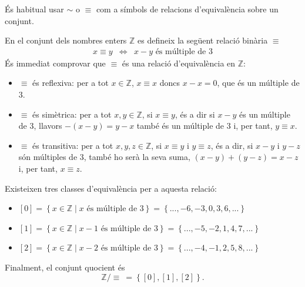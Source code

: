 És habitual usar $\sim$ o $\equiv$ com a símbols de relacions
d'equivalència sobre un conjunt.

\begin{exemple}
En el conjunt dels nombres enters $\mathbb{Z}$ es defineix la següent
relació binària $\equiv$%
\begin{equation*}
\begin{array}{ccc}
x\equiv y & \Longleftrightarrow & x-y\text{ és múltiple de }3%
\end{array}
\end{equation*}
És immediat comprovar que $\equiv$ és una relació d'equivalència en $\mathbb{Z}$:

\begin{itemize}
\item $\equiv$ és reflexiva: per a tot $x\in\mathbb{Z}$, $x\equiv x$
doncs $x-x=0$, que és un múltiple de $3$.

\item $\equiv$ és simètrica: per a tot $x,y\in\mathbb{Z}$, si $%
x\equiv y$, és a dir si $x-y$ és un múltiple de $3$, llavors 
$-(x-y)=y-x$ també és un múltiple de $3$ i, per tant, $y\equiv x$.

\item $\equiv$ és transitiva: per a tot $x,y,z\in\mathbb{Z}$, si $%
x\equiv y$ i $y\equiv z$, és a dir, si $x-y$ i $y-z$ són múltiples de $3$, també ho serà la seva suma, $(x-y)+(y-z)=x-z$ i, per
tant, $x\equiv z$.
\end{itemize}

Existeixen tres classes d'equivalència per a aquesta relació:

\begin{itemize}
\item $\left[ 0\right] =\left\{ x\in\mathbb{Z}\mid x\text{ és múltiple de }3\right\} =\left\{ ...,-6,-3,0,3,6,...\right\} $

\item $\left[ 1\right] =\left\{ x\in\mathbb{Z}\mid x-1\text{ és múltiple de }3\right\} =\left\{ ...,-5,-2,1,4,7,...\right\} $

\item $\left[ 2\right] =\left\{ x\in\mathbb{Z}\mid x-2\text{ és múltiple de }3\right\} =\left\{ ...,-4,-1,2,5,8,...\right\} $
\end{itemize}

Finalment, el conjunt quocient és%
\begin{equation*}
\mathbb{Z}/\equiv~=\left\{ \left[ 0\right] ,\left[ 1\right] ,\left[ 2\right]
\right\} \text{.}
\end{equation*}
\end{exemple}

